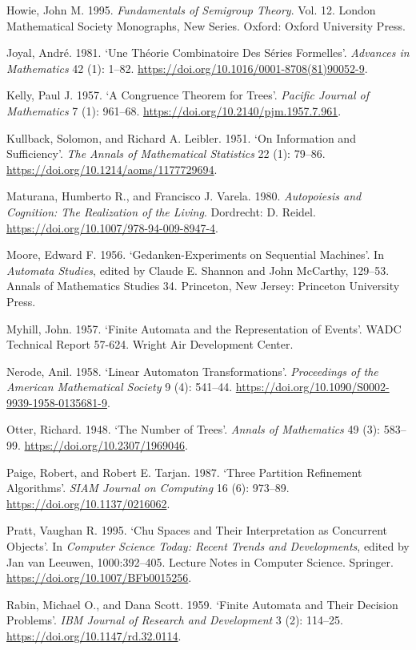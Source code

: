 \documentclass[11pt,a4paper]{article}
\begin{document}
Howie, John M. 1995. \emph{Fundamentals of Semigroup Theory}. Vol. 12.
London Mathematical Society Monographs, New Series. Oxford: Oxford
University Press.

Joyal, André. 1981. `Une Théorie Combinatoire Des Séries Formelles'.
\emph{Advances in Mathematics} 42 (1): 1--82.
\url{https://doi.org/10.1016/0001-8708(81)90052-9}.

Kelly, Paul J. 1957. `A Congruence Theorem for Trees'. \emph{Pacific
Journal of Mathematics} 7 (1): 961--68.
\url{https://doi.org/10.2140/pjm.1957.7.961}.

Kullback, Solomon, and Richard A. Leibler. 1951. `On Information and
Sufficiency'. \emph{The Annals of Mathematical Statistics} 22 (1):
79--86. \url{https://doi.org/10.1214/aoms/1177729694}.

Maturana, Humberto R., and Francisco J. Varela. 1980. \emph{Autopoiesis
and Cognition: The Realization of the Living}. Dordrecht: D. Reidel.
\url{https://doi.org/10.1007/978-94-009-8947-4}.

Moore, Edward F. 1956. `Gedanken-Experiments on Sequential Machines'. In
\emph{Automata Studies}, edited by Claude E. Shannon and John McCarthy,
129--53. Annals of Mathematics Studies 34. Princeton, New Jersey:
Princeton University Press.

Myhill, John. 1957. `Finite Automata and the Representation of Events'.
WADC Technical Report 57-624. Wright Air Development Center.

Nerode, Anil. 1958. `Linear Automaton Transformations'.
\emph{Proceedings of the American Mathematical Society} 9 (4): 541--44.
\url{https://doi.org/10.1090/S0002-9939-1958-0135681-9}.

Otter, Richard. 1948. `The Number of Trees'. \emph{Annals of
Mathematics} 49 (3): 583--99. \url{https://doi.org/10.2307/1969046}.

Paige, Robert, and Robert E. Tarjan. 1987. `Three Partition Refinement
Algorithms'. \emph{SIAM Journal on Computing} 16 (6): 973--89.
\url{https://doi.org/10.1137/0216062}.

Pratt, Vaughan R. 1995. `Chu Spaces and Their Interpretation as
Concurrent Objects'. In \emph{Computer Science Today: Recent Trends and
Developments}, edited by Jan van Leeuwen, 1000:392--405. Lecture Notes
in Computer Science. Springer. \url{https://doi.org/10.1007/BFb0015256}.

Rabin, Michael O., and Dana Scott. 1959. `Finite Automata and Their
Decision Problems'. \emph{IBM Journal of Research and Development} 3
(2): 114--25. \url{https://doi.org/10.1147/rd.32.0114}.
\end{document}

